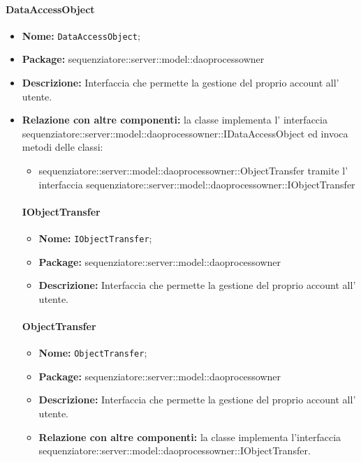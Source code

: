\paragraph{DataAccessObject}
	\begin{itemize}
		\item \textbf{Nome:} \texttt{DataAccessObject};
		\item \textbf{Package:} sequenziatore::server::model::daoprocessowner
		\item \textbf{Descrizione:} Interfaccia che permette la gestione del proprio account all' utente.
		\item \textbf{Relazione con altre componenti:} la classe implementa l' interfaccia sequenziatore::server::model::daoprocessowner::IDataAccessObject ed invoca metodi delle classi:
		\begin{itemize}
			\item sequenziatore::server::model::daoprocessowner::ObjectTransfer tramite l' interfaccia sequenziatore::server::model::daoprocessowner::IObjectTransfer
	\end{itemize}
\paragraph{IObjectTransfer}
	\begin{itemize}
		\item \textbf{Nome:} \texttt{IObjectTransfer};
		\item \textbf{Package:} sequenziatore::server::model::daoprocessowner
		\item \textbf{Descrizione:} Interfaccia che permette la gestione del proprio account all' utente.
	\end{itemize}
\paragraph{ObjectTransfer}
	\begin{itemize}
		\item \textbf{Nome:} \texttt{ObjectTransfer};
		\item \textbf{Package:} sequenziatore::server::model::daoprocessowner
		\item \textbf{Descrizione:} Interfaccia che permette la gestione del proprio account all' utente.
		\item \textbf{Relazione con altre componenti:} la classe implementa l'interfaccia sequenziatore::server::model::daoprocessowner::IObjectTransfer.
	\end{itemize}

\end{itemize}
